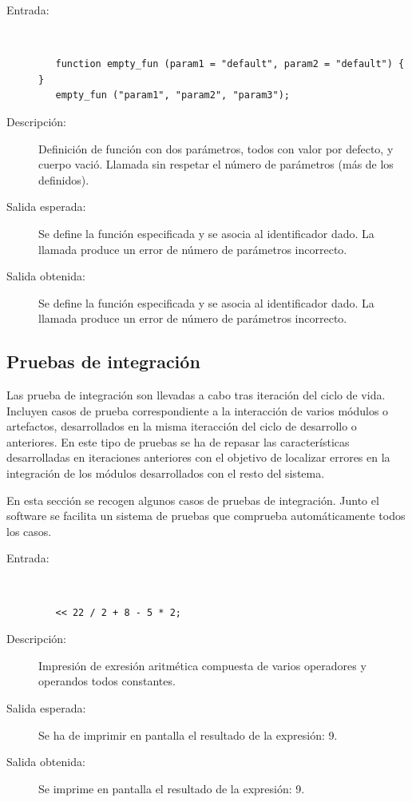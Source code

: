 \begin{framed}
	\begin{description}
		\item [Entrada:] \hfill \\
\begin{lstlisting}
   function empty_fun (param1 = "default", param2 = "default") { } 
   empty_fun ("param1", "param2", "param3");
\end{lstlisting}
		\item [Descripción:] Definición de función con dos parámetros, todos con valor por defecto, y cuerpo vació. Llamada sin respetar el número de parámetros (más de los definidos).
		\item [Salida esperada:] Se define la función especificada y se asocia al identificador dado. La llamada produce un error de número de parámetros incorrecto.
		\item [Salida obtenida:] Se define la función especificada y se asocia al identificador dado. La llamada produce un error de número de parámetros incorrecto.
	\end{description}
\end{framed}

\subsection{Pruebas de integración}
Las prueba de integración son llevadas a cabo tras iteración del ciclo de vida. Incluyen casos de prueba correspondiente a la interacción de varios módulos o artefactos, desarrollados 
en la misma iteracción del ciclo de desarrollo o anteriores. En este tipo de pruebas se ha de repasar las características desarrolladas en iteraciones anteriores con el objetivo de localizar errores en la integración 
de los módulos desarrollados con el resto del sistema.

En esta sección se recogen algunos casos de pruebas de integración. Junto el software se facilita un sistema de pruebas que comprueba automáticamente todos los casos.

\begin{framed}
	\begin{description}
		\item [Entrada:] \hfill \\
\begin{lstlisting}
   << 22 / 2 + 8 - 5 * 2;
\end{lstlisting}
		\item [Descripción:] Impresión de exresión aritmética compuesta de varios operadores y operandos todos constantes.
		\item [Salida esperada:] Se ha de imprimir en pantalla el resultado de la expresión: 9.
		\item [Salida obtenida:] Se imprime en pantalla el resultado de la expresión: 9.
	\end{description}
\end{framed} 


